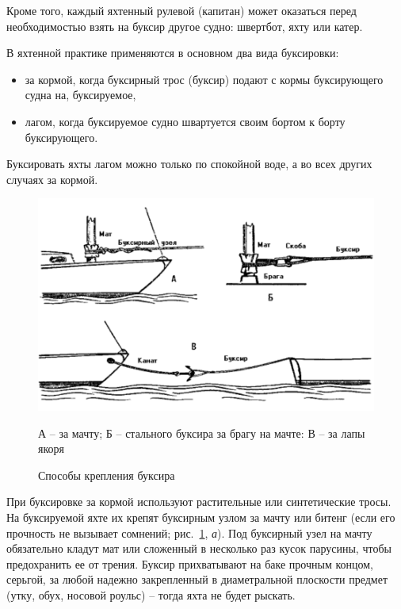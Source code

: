 \documentclass[a4paper, 12pt, twoside, final]{scrbook}
\begin{document}
Кроме того, каждый яхтенный рулевой (капитан) может оказаться перед необходимостью взять на буксир другое судно: швертбот, яхту или катер.

В яхтенной практике применяются в основном два вида буксировки:

\begin{itemize}
\item за кормой, когда буксирный трос (буксир) подают с кормы буксирующего судна на, буксируемое,
\item лагом, когда буксируемое судно швартуется своим бортом к борту буксирующего.
\end{itemize}

Буксировать яхты лагом можно только по спокойной воде, а во всех других случаях за кормой.

\begin{figure}[htbp]
   \centering
   \includegraphics{pics/137_Krepl_buksira} %
   \caption{Способы крепления буксира}
   \label{fig:137}
   \centering\small
   А \--- за мачту; Б \--- стального буксира за брагу на мачте: В \--- за лапы якоря
\end{figure}

При буксировке за кормой используют растительные или синтетические тросы. На буксируемой яхте их крепят буксирным узлом за мачту или битенг (если его прочность не вызывает сомнений; рис.~\ref{fig:137}, \textit{а}). Под буксирный узел на мачту обязательно кладут мат или сложенный в несколько раз кусок парусины, чтобы предохранить ее от трения. Буксир прихватывают на баке прочным концом, серьгой, за любой надежно закрепленный в диаметральной плоскости предмет (утку, обух, носовой роульс) \--- тогда яхта не будет рыскать.
\end{document}
